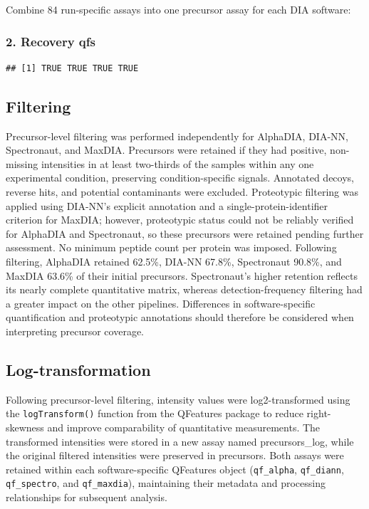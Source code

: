 \documentclass[
  10pt,
]{article}
\begin{document}
Combine 84 run-specific assays into one precursor assay for each DIA
software:

\subsubsection{2. Recovery qfs}\label{recovery-qfs-1}

\begin{verbatim}
## [1] TRUE TRUE TRUE TRUE
\end{verbatim}

\subsection{Filtering}\label{filtering}

Precursor-level filtering was performed independently for AlphaDIA,
DIA-NN, Spectronaut, and MaxDIA. Precursors were retained if they had
positive, non-missing intensities in at least two-thirds of the samples
within any one experimental condition, preserving condition-specific
signals. Annotated decoys, reverse hits, and potential contaminants were
excluded. Proteotypic filtering was applied using DIA-NN's explicit
annotation and a single-protein-identifier criterion for MaxDIA;
however, proteotypic status could not be reliably verified for AlphaDIA
and Spectronaut, so these precursors were retained pending further
assessment. No minimum peptide count per protein was imposed. Following
filtering, AlphaDIA retained 62.5\%, DIA-NN 67.8\%, Spectronaut 90.8\%,
and MaxDIA 63.6\% of their initial precursors. Spectronaut's higher
retention reflects its nearly complete quantitative matrix, whereas
detection-frequency filtering had a greater impact on the other
pipelines. Differences in software-specific quantification and
proteotypic annotations should therefore be considered when interpreting
precursor coverage.

\subsection{Log-transformation}\label{log-transformation}

Following precursor-level filtering, intensity values were
log2-transformed using the \texttt{logTransform()} function from the
QFeatures package to reduce right-skewness and improve comparability of
quantitative measurements. The transformed intensities were stored in a
new assay named precursors\_log, while the original filtered intensities
were preserved in precursors. Both assays were retained within each
software-specific QFeatures object (\texttt{qf\_alpha},
\texttt{qf\_diann}, \texttt{qf\_spectro}, and \texttt{qf\_maxdia}),
maintaining their metadata and processing relationships for subsequent
analysis.
\end{document}
